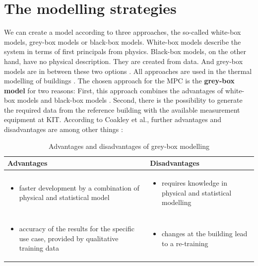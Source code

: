     \section{The modelling strategies}
    \label{ModellingStrategies}
    We can create a model according to three approaches, the so-called white-box models, grey-box models or black-box models. White-box models describe the system in terms of first principals from physics. Black-box models, on the other hand, have no physical description. They are created from data. And grey-box models are in between these two options \cite{Statusseminar.ForschungfurEnergieoptimiertesBauen.2009}. All approaches are used in the thermal modelling of buildings \cite{Kramer.2012}.
    \newline
    The chosen approach for the MPC is the \textbf{grey-box model} for two reasons: First, this approach combines the advantages of white-box models and black-box models \cite{EstradaFlores.2006}. Second, there is the possibility to generate the required data from the reference building with the available measurement equipment at KIT. According to Coakley et al., further advantages and disadvantages are among other things \cite{Coakley.2014}:
    \begin{table}[h!]
    \label{Advantages and disadvantages of grey-box modelling}
        \centering
        \begin{tabular}{p{7.3cm} | p{7.3cm}}
        \hline
          Advantages  &  Disadvantages\\
        \hline
        \begin{itemize}
            \item faster development by a combination of physical and statistical model
        \end{itemize}
      & \begin{itemize}
            \item requires knowledge in physical and statistical modelling 
        \end{itemize}\\
     \begin{itemize}
            \item accuracy of the results for the specific use case, provided by qualitative training data
        \end{itemize} & \begin{itemize}
            \item changes at the building lead to a re-training
        \end{itemize}\\
        \end{tabular}
        \caption {Advantages and disadvantages of grey-box modelling}
    \end{table}
